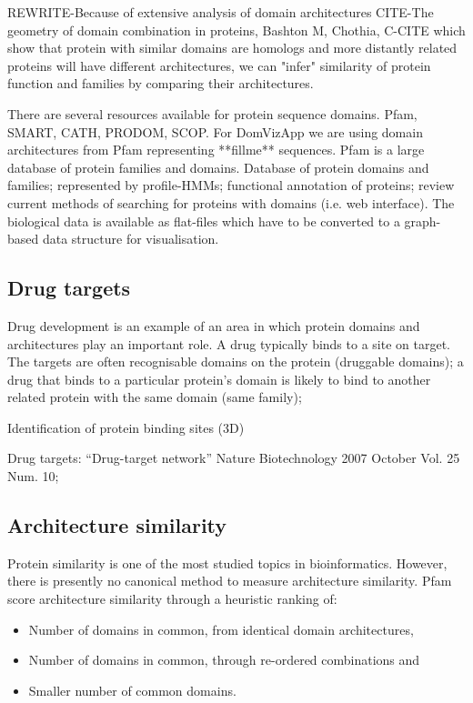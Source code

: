 REWRITE-Because of extensive analysis of domain architectures CITE-The geometry of domain combination in proteins, Bashton M, Chothia, C-CITE which show that protein with similar domains are homologs and more distantly related proteins will have different architectures, we can "infer" similarity of protein function and families by comparing their architectures.

There are several resources available for protein sequence domains. Pfam, SMART, CATH, PRODOM, SCOP. For DomVizApp we are using domain architectures from Pfam representing **fillme** sequences. Pfam is a large database of protein families and domains. Database of protein domains and families; represented by profile-HMMs; functional annotation of proteins; review current methods of searching for proteins with domains (i.e. web interface). The biological data is available as flat-files which have to be converted to a graph-based data structure for visualisation.

\subsection{Drug targets} Drug development is an example of an area in which protein domains and architectures play an important role. A drug typically binds to a site on target. The targets are often recognisable domains on the protein (druggable domains); a drug that binds to a particular protein's domain is likely to bind to another related protein with the same domain (same family);

Identification of protein binding sites (3D)

Drug targets: ``Drug-target network'' Nature Biotechnology 2007 October Vol. 25 Num. 10; 

\subsection{Architecture similarity}
Protein similarity is one of the most studied topics in bioinformatics. However, there is presently no canonical method to measure architecture similarity. Pfam score architecture similarity through a heuristic ranking \cite{pfam2002} of:
\begin{itemize}
	\item Number of domains in common, from identical domain architectures,
	\item Number of domains in common, through re-ordered combinations and
	\item Smaller number of common domains.
\end{itemize}


